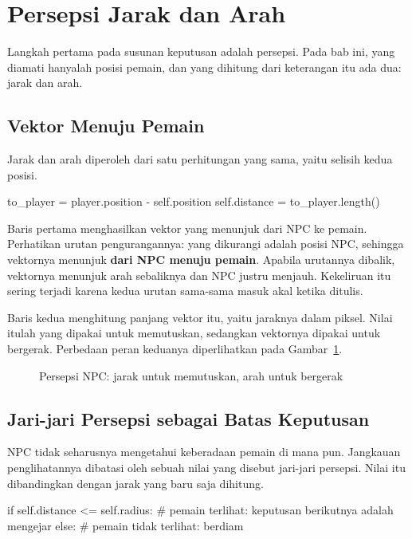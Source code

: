 \section{Persepsi Jarak dan Arah}
\label{sec:persepsi}

Langkah pertama pada susunan keputusan adalah persepsi. Pada bab ini, yang
diamati hanyalah posisi pemain, dan yang dihitung dari keterangan itu ada dua:
jarak dan arah.

\subsection{Vektor Menuju Pemain}

Jarak dan arah diperoleh dari satu perhitungan yang sama, yaitu selisih kedua
posisi.

\begin{kodekeluaran}
to_player = player.position - self.position
self.distance = to_player.length()
\end{kodekeluaran}

Baris pertama menghasilkan vektor yang menunjuk dari NPC ke pemain. Perhatikan
urutan pengurangannya: yang dikurangi adalah posisi NPC, sehingga vektornya
menunjuk \textbf{dari NPC menuju pemain}. Apabila urutannya dibalik, vektornya
menunjuk arah sebaliknya dan NPC justru menjauh. Kekeliruan itu sering terjadi
karena kedua urutan sama-sama masuk akal ketika ditulis.

Baris kedua menghitung panjang vektor itu, yaitu jaraknya dalam piksel. Nilai
itulah yang dipakai untuk memutuskan, sedangkan vektornya dipakai untuk
bergerak. Perbedaan peran keduanya diperlihatkan pada
Gambar~\ref{fig:persepsi-npc}.

\begin{figure}[htbp]
\centering

\caption{Persepsi NPC: jarak untuk memutuskan, arah untuk bergerak}
\label{fig:persepsi-npc}
\end{figure}

\subsection{Jari-jari Persepsi sebagai Batas Keputusan}

NPC tidak seharusnya mengetahui keberadaan pemain di mana pun. Jangkauan
penglihatannya dibatasi oleh sebuah nilai yang disebut jari-jari persepsi.
Nilai itu dibandingkan dengan jarak yang baru saja dihitung.

\begin{kodekeluaran}
if self.distance <= self.radius:
    # pemain terlihat: keputusan berikutnya adalah mengejar
else:
    # pemain tidak terlihat: berdiam
\end{kodekeluaran}

